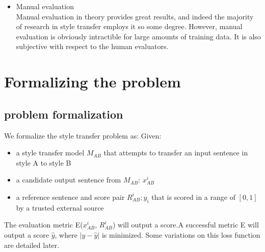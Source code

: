 \documentclass[letterpaper, 10 pt, conference]{ieeeconf}  %
\begin{document}
\begin{itemize}
  \item{Manual evaluation}\\
  Manual evaluation in theory provides great results, and indeed the majority of research in style transfer employs it so some degree. However, manual evaluation is obviously intractible for large amounts of training data. It is also subjective with respect to the human evaluators.
\end{itemize}

\section{Formalizing the problem}
  \subsection{problem formalization} We formalize the style transfer problem as:
    Given:
    \begin{itemize}
      \item a style transfer model $M_{AB}$ that attempts to transfer an input sentence in style A to style B
      \item a candidate output sentence from $M_{AB}$:  $x_{AB}^i$
      \item a reference sentence and score pair $R_{AB}^i ; y_i$ that is scored in a range of $[0,1]$ by a trusted external source
    \end{itemize}

  The evaluation metric E($x_{AB}^i$, $R_{AB}^i$) will output a score.A successful metric E will output a score $\hat{y}$, where $|y-\hat{y}|$ is minimized. Some variations on this loss function are detailed later.
\end{document}
